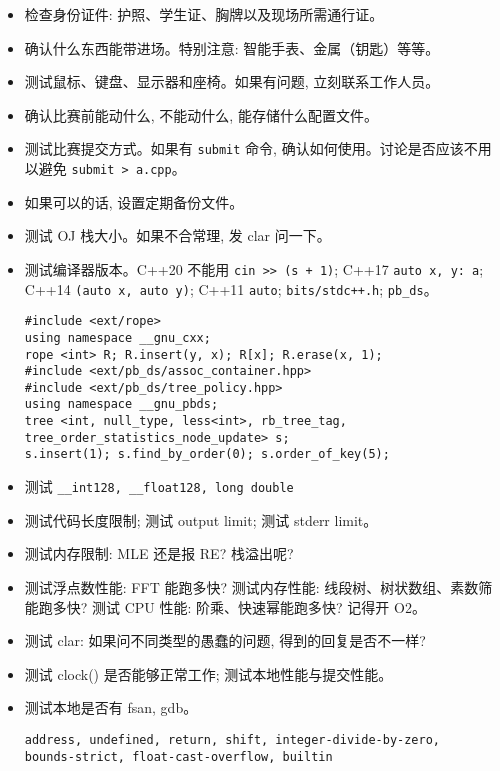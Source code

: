 \begin{small}
\begin{itemize}[leftmargin=1mm]
    \setlength{\itemsep}{0pt}
    \setlength{\parskip}{0.5pt}
    \item 检查身份证件: 护照、学生证、胸牌以及现场所需通行证。
    \item 确认什么东西能带进场。特别注意: 智能手表、金属（钥匙）等等。
    \item 测试鼠标、键盘、显示器和座椅。如果有问题, 立刻联系工作人员。
    \item 确认比赛前能动什么, 不能动什么, 能存储什么配置文件。
    \item 测试比赛提交方式。如果有 \texttt{submit} 命令, 确认如何使用。讨论是否应该不用以避免 \texttt{submit > a.cpp}。
    \item 如果可以的话, 设置定期备份文件。
    \item 测试 OJ 栈大小。如果不合常理, 发 clar 问一下。
    \item 测试编译器版本。C++20 不能用 \texttt{cin >> (s + 1)}; C++17 \texttt{auto \lbrack x, y\rbrack : a}; C++14 \texttt{\lbrack \rbrack (auto x, auto y)}; C++11 \texttt{auto}; \texttt{bits/stdc++.h}; \texttt{pb\_ds}。
\begin{verbatim}
#include <ext/rope>
using namespace __gnu_cxx;
rope <int> R; R.insert(y, x); R[x]; R.erase(x, 1);
#include <ext/pb_ds/assoc_container.hpp> 
#include <ext/pb_ds/tree_policy.hpp> 
using namespace __gnu_pbds;
tree <int, null_type, less<int>, rb_tree_tag,
tree_order_statistics_node_update> s;
s.insert(1); s.find_by_order(0); s.order_of_key(5);
\end{verbatim}
    \item 测试 \texttt{\_\_int128, \_\_float128, long double}
    \item 测试代码长度限制; 测试 output limit; 测试 stderr limit。
    \item 测试内存限制: MLE 还是报 RE? 栈溢出呢? 
    \item 测试浮点数性能: FFT 能跑多快? 测试内存性能: 线段树、树状数组、素数筛能跑多快? 测试 CPU 性能: 阶乘、快速幂能跑多快? 记得开 O2。
    \item 测试 clar: 如果问不同类型的愚蠢的问题, 得到的回复是否不一样? 
    \item 测试 clock() 是否能够正常工作; 测试本地性能与提交性能。
    \item 测试本地是否有 fsan, gdb。\begin{verbatim}
address, undefined, return, shift, integer-divide-by-zero,
bounds-strict, float-cast-overflow, builtin

\end{verbatim}
\end{itemize}
\end{small}
